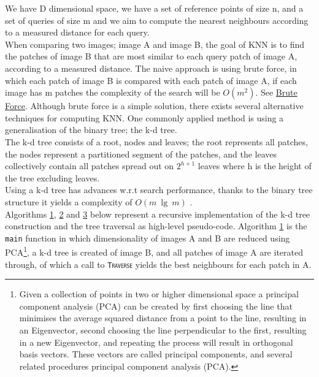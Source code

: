 We have D dimensional space, we have a set of reference points of size n, and a set of queries of size m and we aim to compute the nearest neighbours according to a measured distance for each query. 
\\[2mm]
When comparing two images; image A and image B, the goal of KNN is to find the patches of image B that are most similar to each query patch of image A, according to a measured distance. The naive approach is using brute force, in which each patch of image B is compared with each patch of image A, if each image has m patches the complexity of the search will be $O(m^2)$. See \hyperref[sec:brute]{Brute Force}. Although brute force is a simple solution, there exists several alternative techniques for computing KNN. One commonly applied method is using a generalisation of the binary tree; the k-d tree. 
\\[2mm]
The k-d tree consists of a root, nodes and leaves; the root represents all patches, the nodes represent a partitioned segment of the patches, and the leaves collectively contain all patches spread out on $2^{h+1}$ leaves where h is the height of the tree excluding leaves.
\\[2mm]
Using a k-d tree has advances w.r.t search performance, thanks to the binary tree structure it yields a complexity of $O(m\ \lg\ m)$ \cite{logmatches}.
\\[2mm]
Algorithms \hyperref[alg:main]{1}, \hyperref[alg:tree]{2} and \hyperref[alg:traverse]{3} below represent a recursive implementation of the k-d tree construction and the tree traversal as high-level pseudo-code. 
Algorithm \hyperref[alg:main]{1} is the \texttt{main} function in which dimensionality of images A and B are reduced using PCA\footnote{Given a collection of points in two or higher dimensional space a principal component analysis (PCA) can be created by first choosing the line that minimises the average squared distance from a point to the line, resulting in an Eigenvector, second choosing the line perpendicular to the first, resulting in a new Eigenvector, and repeating the process will result in orthogonal basis vectors. These vectors are called principal components, and several related procedures principal component analysis (PCA).}, a k-d tree is created of image B, and all patches of image A are iterated through, of which a call to \texttt{\textsc{Traverse}} yields the best neighbours for each patch in A. 


